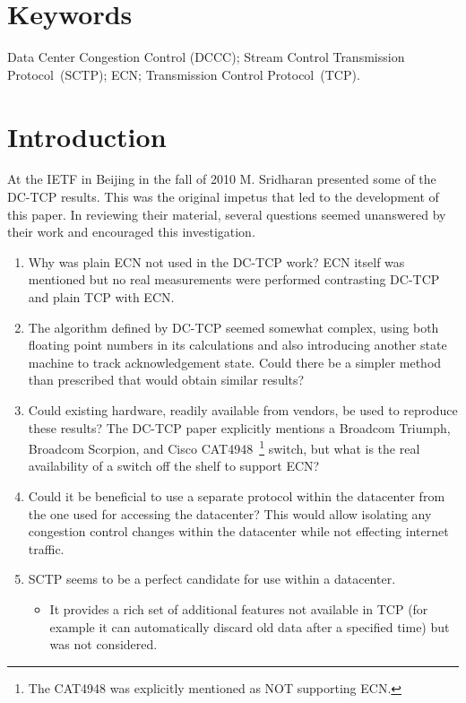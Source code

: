 \documentclass[12pt]{article}
\begin{document}
\section*{Keywords}
Data Center Congestion Control (DCCC);
Stream Control Transmission Protocol~(SCTP);
ECN;
Transmission Control Protocol~(TCP).

\section{Introduction}
At the IETF in Beijing in the fall of 2010 M. Sridharan presented some of the DC-TCP results.
This was the original impetus that led to the development of
this paper. In reviewing their material, several questions seemed unanswered by their
work and encouraged this investigation.

\begin{enumerate}
\item Why was plain ECN not used in the DC-TCP work? ECN itself was mentioned but no
real measurements were performed contrasting DC-TCP and plain TCP with ECN.

\item The algorithm defined by DC-TCP seemed somewhat complex,  using
both floating point numbers in its calculations and also introducing
another state machine to track acknowledgement state.  Could there be a simpler method than prescribed that would obtain similar results?

\item Could existing hardware, readily available from vendors, be used to reproduce these results? The
DC-TCP paper explicitly mentions a  Broadcom Triumph,  Broadcom Scorpion, and Cisco CAT4948~\footnote{The 
CAT4948 was explicitly mentioned as NOT supporting ECN.} switch, but what is the real availability of 
a switch off the shelf to support ECN?

\item Could it be beneficial to use a separate protocol within the
  datacenter from the one used for  accessing the datacenter?
      This would allow isolating any congestion control changes within the datacenter
      while not effecting internet traffic.

\item SCTP seems to be a perfect candidate for use within a datacenter.

\begin{itemize}
\item It provides a rich set of additional features not available in
      TCP (for example it can automatically discard old data after a specified time) but was not considered. 


\end{itemize}
\end{enumerate}
\end{document}
